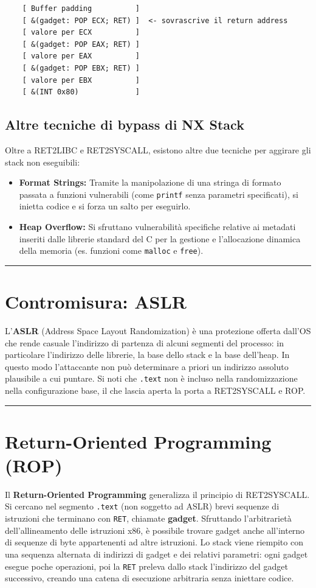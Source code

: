 \documentclass[12pt, a4paper]{report}
\begin{document}
\begin{lstlisting}
	[ Buffer padding          ]
	[ &(gadget: POP ECX; RET) ]  <- sovrascrive il return address
	[ valore per ECX          ]
	[ &(gadget: POP EAX; RET) ]
	[ valore per EAX          ]
	[ &(gadget: POP EBX; RET) ]
	[ valore per EBX          ]
	[ &(INT 0x80)             ]
\end{lstlisting}

\subsection{Altre tecniche di bypass di NX Stack}
Oltre a RET2LIBC e RET2SYSCALL, esistono altre due tecniche per aggirare gli stack non eseguibili:
\begin{itemize}
	\item \textbf{Format Strings:} Tramite la manipolazione di una stringa di formato passata a funzioni vulnerabili (come \texttt{printf} senza parametri specificati), si inietta codice e si forza un salto per eseguirlo.
	\item \textbf{Heap Overflow:} Si sfruttano vulnerabilità specifiche relative ai metadati inseriti dalle librerie standard del C per la gestione e l'allocazione dinamica della memoria (es. funzioni come \texttt{malloc} e \texttt{free}).
\end{itemize}

\noindent\rule{\textwidth}{0.4pt}

\section{Contromisura: ASLR}

L'\textbf{ASLR} (Address Space Layout Randomization) è una protezione offerta dall'OS che rende casuale l'indirizzo di partenza di alcuni segmenti del processo: in particolare l'indirizzo delle librerie, la base dello stack e la base dell'heap. In questo modo l'attaccante non può determinare a priori un indirizzo assoluto plausibile a cui puntare. Si noti che \texttt{.text} non è incluso nella randomizzazione nella configurazione base, il che lascia aperta la porta a RET2SYSCALL e ROP.

\noindent\rule{\textwidth}{0.4pt}

\section{Return-Oriented Programming (ROP)}

Il \textbf{Return-Oriented Programming} generalizza il principio di RET2SYSCALL. Si cercano nel segmento \texttt{.text} (non soggetto ad ASLR) brevi sequenze di istruzioni che terminano con \texttt{RET}, chiamate \textbf{gadget}. Sfruttando l'arbitrarietà dell'allineamento delle istruzioni x86, è possibile trovare gadget anche all'interno di sequenze di byte appartenenti ad altre istruzioni. Lo stack viene riempito con una sequenza alternata di indirizzi di gadget e dei relativi parametri: ogni gadget esegue poche operazioni, poi la \texttt{RET} preleva dallo stack l'indirizzo del gadget successivo, creando una catena di esecuzione arbitraria senza iniettare codice.
\end{document}
